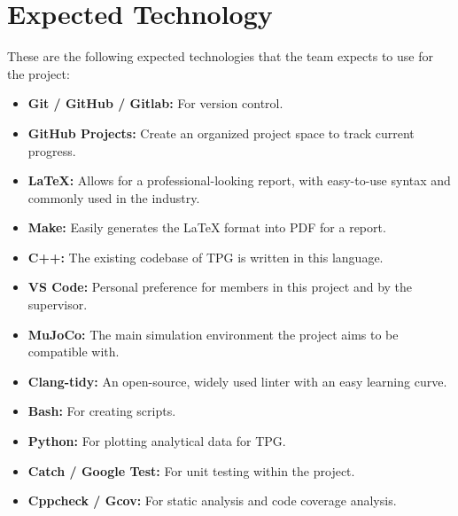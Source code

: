 \documentclass{article}
\begin{document}
\section{Expected Technology}


These are the following expected technologies that the team expects to use for the project:

\begin{itemize}
  \item \textbf{Git / GitHub / Gitlab:} For version control.
  \item \textbf{GitHub Projects:}  Create an organized project space to track current progress.
  \item \textbf{LaTeX:} Allows for a professional-looking report, with easy-to-use syntax and commonly used in the industry.
  \item \textbf{Make:}  Easily generates the LaTeX format into PDF for a report.
  \item \textbf{C++:} The existing codebase of TPG is written in this language.
  \item \textbf{VS Code:} Personal preference for members in this project and by the supervisor.
  \item \textbf{MuJoCo:} The main simulation environment the project aims to be compatible with.
  \item \textbf{Clang-tidy:} An open-source, widely used linter with an easy learning curve.
  \item \textbf{Bash:} For creating scripts.
  \item \textbf{Python:} For plotting analytical data for TPG.
  \item \textbf{Catch / Google Test:} For unit testing within the project.
  \item \textbf{Cppcheck / Gcov:} For static analysis and code coverage analysis.
\end{itemize}

\end{document}
